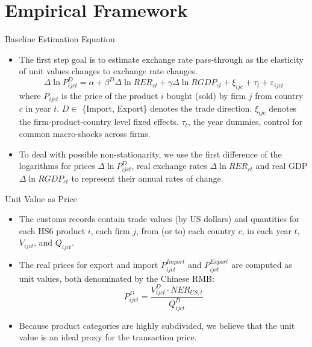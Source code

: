 \documentclass[10pt]{beamer}
\begin{document}
\section{Empirical Framework}

\begin{frame}{Baseline Estimation Equation}
	\begin{itemize}
		\item The first step goal is to estimate exchange rate pass-through as the elasticity of unit values changes to exchange rate changes.
		\begin{equation}
			\Delta \ln P^{D}_{i j c t}=\alpha+\beta^D \Delta \ln R E R_{c t}+\gamma \Delta \ln R G D P_{c t}+\xi_{i j c}+\tau_{t}+\varepsilon_{i j c t}
			\label{eq4.1}
		\end{equation}
		{\footnotesize where $P_{ijct}$ is the price of the product $i$ bought (sold) by firm $j$ from country $c$ in year $t$.  $D \in$ \{Import, Export\} denotes the trade direction. $\xi_{ijc}$ denotes the firm-product-country level fixed effects. $\tau_t$, the year dummies, control for common macro-shocks across firms.}
		\item To deal with possible non-stationarity, we use the first difference of the logarithms for prices $\Delta \ln P^{D}_{i j c t}$, real exchange rates $\Delta \ln R E R_{c t}$ and real GDP $\Delta \ln R G D P_{c t}$ to represent their annual rates of change.
	\end{itemize}
\end{frame}

\begin{frame}{Unit Value as Price}
	\begin{itemize}
		\item The customs records contain trade values (by US dollars) and quantities for each HS6 product $i$, each firm $j$, from (or to) each country $c$, in each year $t$, $V_{ijct}$, and $Q_{ijct}$.
		\item The real prices for export and import $P^{Import}_{i j c t}$ and $P^{Export}_{i j c t}$ are computed as unit values, both denominated by the Chinese RMB:
		$$
		P^{D}_{ijct}=\frac{V^{D}_{ijct}\cdot NER_{US,t}}{Q^{D}_{ijct}}
		$$
		\item Because product categories are highly subdivided, we believe that the unit value is an ideal proxy for the transaction price.
	\end{itemize}
\end{frame}
\end{document}
